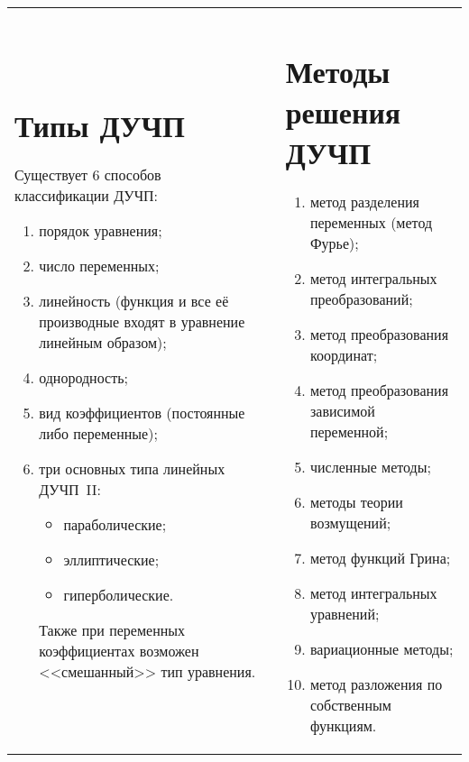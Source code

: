 \begin{table}[h!]
    \begin{tabular}{m{}cm{}}
        \section{Типы ДУЧП}

        Существует 6 способов классификации ДУЧП:
        \begin{enumerate}\itemsep-.4em
            \item порядок уравнения;
            \item число переменных;
            \item линейность (функция и все её производные входят в уравнение
            линейным образом);
            \item однородность;
            \item вид коэффициентов (постоянные либо переменные);
            \item три основных типа линейных ДУЧП~II:
            \begin{itemize}\itemsep-.4em
                \item параболические;
                \item эллиптические;
                \item гиперболические.
            \end{itemize}

            Также при переменных коэффициентах возможен <<смешанный>> тип
            уравнения.
        \end{enumerate}
        & \hfill &
        \section{Методы решения ДУЧП}

        \begin{enumerate}
            \item метод разделения переменных (метод Фурье);
            \item метод интегральных преобразований;
            \item метод преобразования координат;
            \item метод преобразования зависимой переменной;
            \item численные методы;
            \item методы теории возмущений;
            \item метод функций Грина;
            \item метод интегральных уравнений;
            \item вариационные методы;
            \item метод разложения по собственным функциям.
        \end{enumerate}
    \end{tabular}
\end{table}

